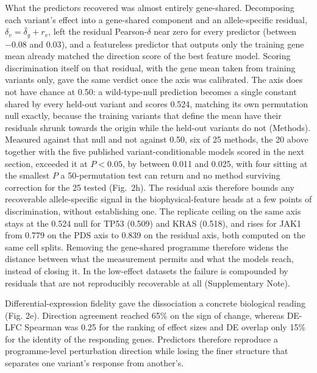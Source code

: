 \documentclass[11pt,letterpaper]{article}
\begin{document}
What the predictors recovered was almost entirely gene-shared. Decomposing each variant's effect into a gene-shared component and an allele-specific residual, $\delta_v = \bar{\delta}_{g} + r_v$, left the residual Pearson-$\delta$ near zero for every predictor (between $-0.08$ and $0.03$), and a featureless predictor that outputs only the training gene mean already matched the direction score of the best feature model. Scoring discrimination itself on that residual, with the gene mean taken from training variants only, gave the same verdict once the axis was calibrated. The axis does not have chance at 0.50: a wild-type-null prediction becomes a single constant shared by every held-out variant and scores 0.524, matching its own permutation null exactly, because the training variants that define the mean have their residuals shrunk towards the origin while the held-out variants do not (Methods). Measured against that null and not against 0.50, six of 25 methods, the 20 above together with the five published variant-conditionable models scored in the next section, exceeded it at $P<0.05$, by between 0.011 and 0.025, with four sitting at the smallest $P$ a 50-permutation test can return and no method surviving correction for the 25 tested (Fig.~2h). The residual axis therefore bounds any recoverable allele-specific signal in the biophysical-feature heads at a few points of discrimination, without establishing one. The replicate ceiling on the same axis stays at the 0.524 null for TP53 (0.509) and KRAS (0.518), and rises for JAK1 from 0.779 on the PDS axis to 0.839 on the residual axis, both computed on the same cell splits. Removing the gene-shared programme therefore widens the distance between what the measurement permits and what the models reach, instead of closing it. In the low-effect datasets the failure is compounded by residuals that are not reproducibly recoverable at all (Supplementary Note).

Differential-expression fidelity gave the dissociation a concrete biological reading (Fig. 2e). Direction agreement reached 65\% on the sign of change, whereas DE-LFC Spearman was 0.25 for the ranking of effect sizes and DE overlap only 15\% for the identity of the responding genes. Predictors therefore reproduce a programme-level perturbation direction while losing the finer structure that separates one variant's response from another's.
\end{document}
